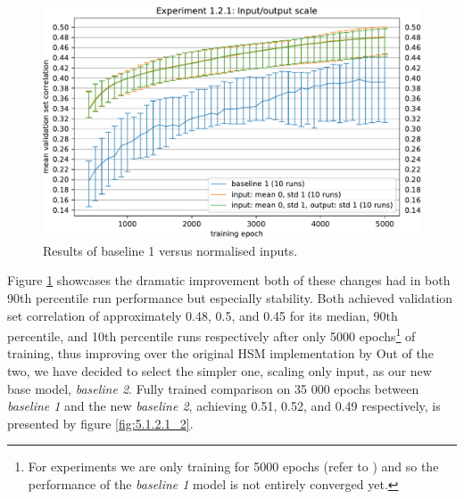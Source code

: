 \begin{figure}[H]
    \centering
    \includegraphics[width=1\textwidth]{../figures/05_1_2_1}
    \caption[Experiment 1.2.1]{Results of baseline 1 versus normalised inputs\protect\footnotemark.}
    \label{fig:5.1.2.1}
\end{figure}

Figure \ref{fig:5.1.2.1} showcases the dramatic improvement both of these changes had in both 90th percentile run performance but especially stability. Both achieved validation set correlation of approximately 0.48, 0.5, and 0.45 for its median, 90th percentile, and 10th percentile runs respectively after only 5000 epochs\footnote{For experiments we are only training for 5000 epochs (refer to  ) and so the performance of the \emph{baseline 1} model is not entirely converged yet.} of training, thus improving over the original HSM implementation by \citeauthor{antolik} Out of the two, we have decided to select the simpler one, scaling only input, as our new base model, \emph{baseline 2}. Fully trained comparison on 35 000 epochs between \emph{baseline 1} and the new \emph{baseline 2}, achieving 0.51, 0.52, and 0.49 respectively, is presented by figure \ref{fig:5.1.2.1_2}.

